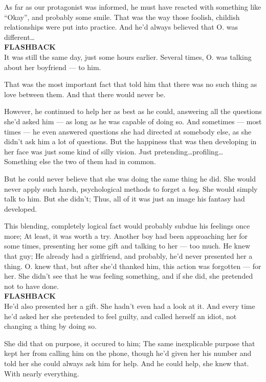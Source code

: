 As far as our protagonist was informed, he must have reacted with something like \enquote{Okay}, and probably some smile. 
That was the way those foolish, childish relationships were put into practice. 
And he'd always believed that O. was different\ldots\\
\textbf{FLASHBACK}\\
It was still the same day, just some hours earlier. 
Several times, O. was talking about her boyfriend --- to him.

That was the most important fact that told him that there was no such thing as love between them. 
And that there would never be.

However, he continued to help her as best as he could, answering all the questions she'd asked him --- as long as he was capable of doing so. 
And sometimes --- most times --- he even answered questions she had directed at somebody else, as she didn't ask him a lot of questions. 
But the happiness that was then developing in her face was just some kind of silly vision. 
Just pretending\ldots profiling\ldots\\
Something else the two of them had in common.

But he could never believe that she was doing the same thing he did. 
She would never apply such harsh, psychological methods to forget a \emph{boy}. She would simply talk to him. 
But she didn't; Thus, all of it was just an image his fantasy had developed.

This blending, completely logical fact would probably subdue his feelings once more; At least, it was worth a try. 
Another boy had been approaching her for some times, presenting her some gift and talking to her --- too much. 
He knew that guy; He already had a girlfriend, and probably, he'd never presented her a thing. 
O. knew that, but after she'd thanked him, this action was forgotten --- for her. 
She didn't see that he was feeling something, and if she did, she pretended not to have done.\\
\textbf{FLASHBACK}\\
He'd also presented her a gift. 
She hadn't even had a look at it.
And every time he'd asked her she pretended to feel guilty, and called herself an idiot, not changing a thing by doing so.

She did that on purpose, it occured to him; The same inexplicable purpose that kept her from calling him on the phone, though he'd given her his number and told her she could always ask him for help. 
And he could help, she knew that.
With nearly everything.

